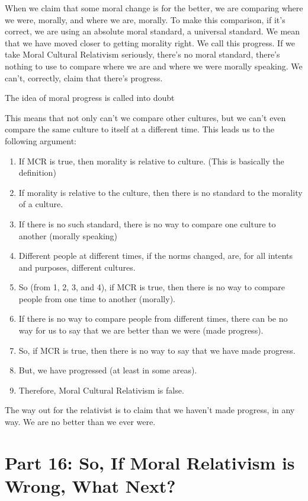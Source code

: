 When we claim that some moral change is for the better, we are comparing where we were, morally, and where we are, morally. To make this comparison, if it's correct, we are using an absolute moral standard, a universal standard. We mean that we have moved closer to getting morality right. We call this progress. If we take Moral Cultural Relativism seriously, there's no moral standard, there's nothing to use to compare where we are and where we were morally speaking. We can't, correctly, claim that there's progress.
\begin{center}
The idea of moral progress is called into doubt
\end{center}
This means that not only can't we compare other cultures, but we can't even compare the same culture to itself at a different time. This leads us to the following argument:
\begin{enumerate}
    \item If MCR is true, then morality is relative to culture. (This is basically the definition)
    \item If morality is relative to the culture, then there is no standard to the morality of a culture.
    \item If there is no such standard, there is no way to compare one culture to another (morally speaking)
    \item Different people at different times, if the norms changed, are, for all intents and purposes, different cultures.
    \item So (from 1, 2, 3, and 4), if MCR is true, then there is no way to compare people from one time to another (morally).
    \item If there is no way to compare people from different times, there can be no way for us to say that we are better than we were (made progress).
    \item So, if MCR is true, then there is no way to say that we have made progress.
    \item But, we have progressed (at least in some areas).
    \item Therefore, Moral Cultural Relativism is false.
\end{enumerate}
The way out for the relativist is to claim that we haven't made progress, in any way. We are no better than we ever were. 

\chapter{Part 16: So, If Moral Relativism is Wrong, What Next?}


